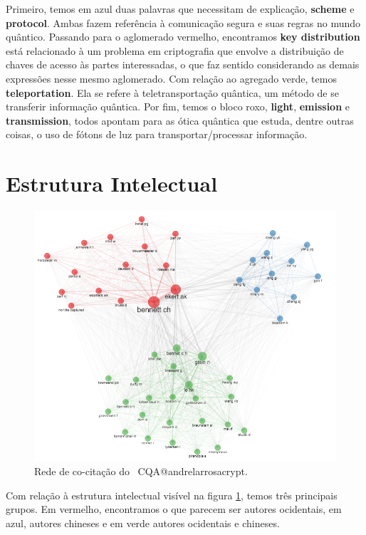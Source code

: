 Primeiro, temos em azul duas palavras que necessitam de explicação, \textbf{scheme} e \textbf{protocol}. Ambas fazem referência à comunicação segura e suas regras no mundo quântico. Passando para o aglomerado vermelho, encontramos \textbf{key distribution} está relacionado à um problema em criptografia que envolve a distribuição de chaves de acesso às partes interessadas, o que faz sentido considerando as demais expressões nesse mesmo aglomerado. Com relação ao agregado verde, temos \textbf{teleportation}. Ela se refere à teletransportação quântica, um método de se transferir informação quântica. Por fim, temos o bloco roxo, \textbf{light}, \textbf{emission} e \textbf{transmission}, todos apontam para as ótica quântica que estuda, dentre outras coisas, o uso de fótons de luz para transportar/processar informação.

\section{Estrutura Intelectual}

\begin{figure}
    \centering
    \includegraphics[angle=0,width=1\textwidth]{experiments/andrelarrosacrypt/AnaliseBibliometrica/CriptografiaQuantica/imagens/CQA@andrelarrosacrypt_CoCit.png}
    \caption{Rede de co-citação do \dataset\ CQA@andrelarrosacrypt.}
    \label{CQA@andrelarrosacrypt_CoCit}
\end{figure}

Com relação à estrutura intelectual visível na figura \ref{CQA@andrelarrosacrypt_CoCit}, temos três principais grupos. Em vermelho, encontramos o que parecem ser autores ocidentais, em azul, autores chineses e em verde autores ocidentais e chineses.

